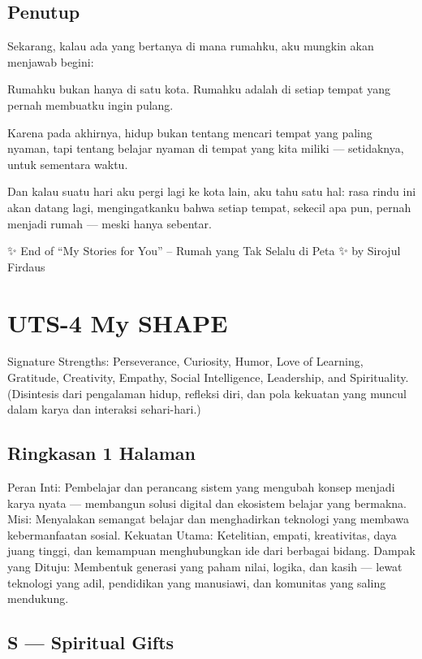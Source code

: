 \documentclass[
  letterpaper,
  DIV=11,
  numbers=noendperiod]{scrreprt}
\begin{document}
\section{Penutup}\label{penutup-1}

Sekarang, kalau ada yang bertanya di mana rumahku, aku mungkin akan
menjawab begini:

Rumahku bukan hanya di satu kota. Rumahku adalah di setiap tempat yang
pernah membuatku ingin pulang.

Karena pada akhirnya, hidup bukan tentang mencari tempat yang paling
nyaman, tapi tentang belajar nyaman di tempat yang kita miliki ---
setidaknya, untuk sementara waktu.

Dan kalau suatu hari aku pergi lagi ke kota lain, aku tahu satu hal:
rasa rindu ini akan datang lagi, mengingatkanku bahwa setiap tempat,
sekecil apa pun, pernah menjadi rumah --- meski hanya sebentar.

✨ End of ``My Stories for You'' -- Rumah yang Tak Selalu di Peta ✨ by
Sirojul Firdaus

\chapter{UTS-4 My SHAPE}\label{uts-4-my-shape}

Signature Strengths: Perseverance, Curiosity, Humor, Love of Learning,
Gratitude, Creativity, Empathy, Social Intelligence, Leadership, and
Spirituality. (Disintesis dari pengalaman hidup, refleksi diri, dan pola
kekuatan yang muncul dalam karya dan interaksi sehari-hari.)

\section{Ringkasan 1 Halaman}\label{ringkasan-1-halaman}

Peran Inti: Pembelajar dan perancang sistem yang mengubah konsep menjadi
karya nyata --- membangun solusi digital dan ekosistem belajar yang
bermakna. Misi: Menyalakan semangat belajar dan menghadirkan teknologi
yang membawa kebermanfaatan sosial. Kekuatan Utama: Ketelitian, empati,
kreativitas, daya juang tinggi, dan kemampuan menghubungkan ide dari
berbagai bidang. Dampak yang Dituju: Membentuk generasi yang paham
nilai, logika, dan kasih --- lewat teknologi yang adil, pendidikan yang
manusiawi, dan komunitas yang saling mendukung.

\section{S --- Spiritual Gifts}\label{s-spiritual-gifts}
\end{document}

